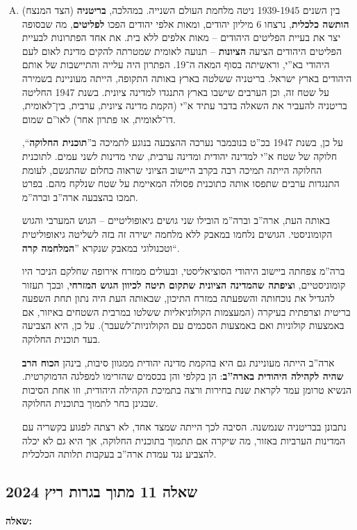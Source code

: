 \documentclass[]{../../../../tex/classes/styledArticle}
\begin{document}
\begin{enumerate}[A.]
		\item בין השנים 1939-1945 ניטה מלחמת העולם השנייה. במהלכה, \textbf{בריטניה} (הצד המנצח) \textbf{הותשה כלכלית}, נרצחו 6 מיליון יהודים, ומאות אלפי יהודים הפכו \textbf{לפליטים}, מה שבסופה יצר את בעיית הפליטים היהודים – מאות אלפים ללא בית. את אחד הפתרונות לבעיית הפליטים היהודים הציעה \textbf{הציונות} – תנועה לאומית שמטרתה להקים מדינת לאום לעם היהודי בא''י, וראשיתה בסוף המאה ה־19. הפתרון היה עלייה והתיישבות של אותם היהודים בארץ ישראל. בריטניה ששלטה בארץ באותה התקופה, הייתה מעוניינת בשמירה על שטח זה, וכן הערבים שישבו בארץ התנגדו למדינה ציונית. בשנת 1947 החליטה בריטניה להעביר את השאלה בדבר עתיד א''י (הקמת מדינה ציונית, ערבית, בין־לאומית, דו־לאומית, או פתרון אחר) לאו''ם שמום. 
		
		על כן, בשנת 1947 בכ''ט בנובמבר נערכה ההצבעה בנוגע לתמיכה ב''\textbf{תוכנית החלוקה}``, חלוקה של שטח א''י למדינה יהודית ומדינה ערבית, שתי מדינות לשני עמים. לתוכנית החלוקה הייתה תמיכה רבה בקרב היישוב הציוני שראוה כחלום שהתגשם, לעומת התנגדות ערבים שתפסו אותה כתוכנית פסולה המאיימת על שטח שנלקח מהם. בפרט תמכו בהצבעה ארה''ב וברה''מ. 
		
		באותה העת, ארה''ב וברה''מ הובילו שני גושים גיאופוליטיים – הגוש המערבי והגוש הקומוניסטי. הגושים נלחמו במאבק ללא מלחמה ישירה זה בזה לשליטה גיאופוליטית וטכנולוגי במאבק שנקרא ''\textbf{המלחמה קרה}``. 
		
		ברה''מ צפחתה ביישוב היהודי הסוציאליסטי, ובעולים ממזרח אירופה שחלקם הניכר היו קומוניסטיים, \textbf{וציפתה שהמדינה הציונית שתקום תיטה לכיוון הגוש המזרחי}, ובכך תעזור להגדיל את נוכחותה והשפעתה במזרח התיכון, שבאותה העת היה נתון תחת השפעה בריטית וצרפתית בעיקרה (המעצמות הקולוניאליות ששלטו במרבית השטחים באיזור, אם באמצעות קולוניות ואם באמצעות הסכמים עם הקולוניות־לשעבר). על כן, היא הצביעה בעד תוכנית החלוקה. 
		
		ארה''ב הייתה מעוניינת גם היא בהקמת מדינה יהודית ממגוון סיבות, בינהן \textbf{הכוח הרב שהיה לקהילה היהודית בארה''ב}: הן בקלפי והן בכסמים שהזרימו למפלגה הדמוקרטית. הנשיא טרומן עמד לקראת שנת בחירות ורצה בתמיכת הקהילה היהודית, וזו אחת הסיבות שבגינן בחר לתמוך בתוכנית החלוקה. 
		
		נתבונן בבריטניה שנמשנה. הסיבה לכך הייתה שמצד אחד, לא רצתה לפגוע בקשריה עם המדינות הערביות באזור, מה שיקרה אם תתמוך בתוכנית החלוקה, אך היא גם לא יכלה להצביע נגד עמדת ארה''ב בעקבות תלותה הכלכלית. 
	\end{enumerate}
	
	\subsection*{שאלה 11 מתוך בגרות ריץ 2024}
	\textbf{שאלה: }
	
\end{document}
